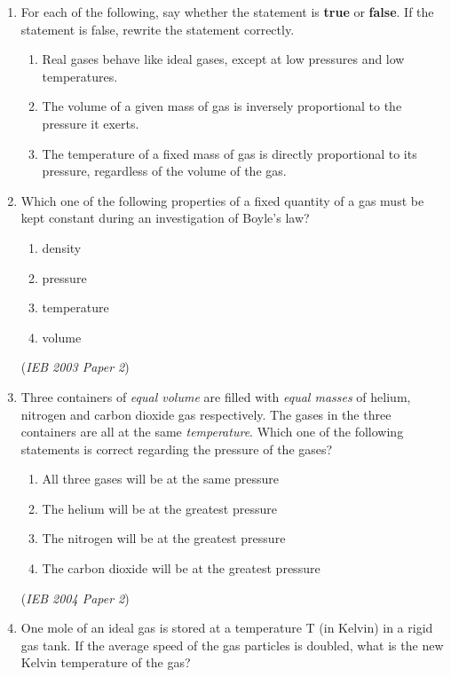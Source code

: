 \begin{eocexercises}{}
\begin{enumerate}
\item{For each of the following, say whether the statement is \textbf{true} or \textbf{false}. If the statement is false, rewrite the statement correctly.}
\begin{enumerate}
\item{Real gases behave like ideal gases, except at low pressures and low temperatures.}
\item{The volume of a given mass of gas is inversely proportional to the pressure it exerts.}
\item{The temperature of a fixed mass of gas is directly proportional to its pressure, regardless of the volume of the gas.}
\end{enumerate}

\item{Which one of the following properties of a fixed quantity of a gas must be kept constant during an investigation of Boyle's law?

\begin{enumerate}
\item{density}
\item{pressure}
\item{temperature}
\item{volume}
\end{enumerate}

(\textit{IEB 2003 Paper 2})
}

\item{Three containers of \textit{equal volume} are filled with \textit{equal masses} of helium, nitrogen and carbon dioxide gas respectively. The gases in the three containers are all at the same \textit{temperature}. Which one of the following statements is correct regarding the pressure of the gases?

\begin{enumerate}
\item{All three gases will be at the same pressure}
\item{The helium will be at the greatest pressure}
\item{The nitrogen will be at the greatest pressure}
\item{The carbon dioxide will be at the greatest pressure}
\end{enumerate}

(\textit{IEB 2004 Paper 2})
}

\item{One mole of an ideal gas is stored at a temperature T (in Kelvin) in a rigid gas tank. If the average speed of the gas particles is doubled, what is the new Kelvin temperature of the gas?

}
\end{enumerate}
\end{eocexercises}
